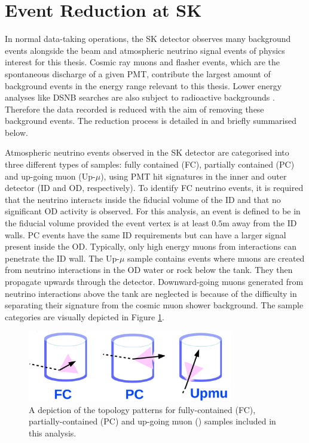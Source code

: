 \section{Event Reduction at SK}
\label{sec:Simulations_Reduction}

In normal data-taking operations, the SK detector observes many background events alongside the beam and atmospheric neutrino signal events of physics interest for this thesis. Cosmic ray muons and flasher events, which are the spontaneous discharge of a given PMT, contribute the largest amount of background events in the energy range relevant to this thesis. Lower energy analyses like DSNB searches are also subject to radioactive backgrounds \cite{Nakano_2017}. Therefore the data recorded is reduced with the aim of removing these background events. The reduction process is detailed in \cite{Ashie_2005, Jiang2019-iw} and briefly summarised below.

Atmospheric neutrino events observed in the SK detector are categorised into three different types of samples: fully contained (FC), partially contained (PC) and up-going muon (Up-$\mu$), using PMT hit signatures in the inner and outer detector (ID and OD, respectively). To identify FC neutrino events, it is required that the neutrino interacts inside the fiducial volume of the ID and that no significant OD activity is observed. For this analysis, an event is defined to be in the fiducial volume provided the event vertex is at least $0.5$m away from the ID walls. PC events have the same ID requirements but can have a larger signal present inside the OD. Typically, only high energy muons from \quickmath{\nu_{\mu}} interactions can penetrate the ID wall. The Up-$\mu$ sample contains events where muons are created from neutrino interactions in the OD water or rock below the tank. They then propagate upwards through the detector. Downward-going muons generated from neutrino interactions above the tank are neglected is because of the difficulty in separating their signature from the cosmic muon shower background. The sample categories are visually depicted in Figure \ref{fig:Simulations_AtmosphericSampleTopology}.

\begin{figure}[ht!]
    \centering
    \includegraphics[width=0.8\textwidth]{Figures/Simulations/Atmo_topology.pdf}
    \caption{A depiction of the topology patterns for fully-contained (FC), partially-contained (PC) and up-going muon () samples included in this analysis.}
    \label{fig:Simulations_AtmosphericSampleTopology}
\end{figure}

